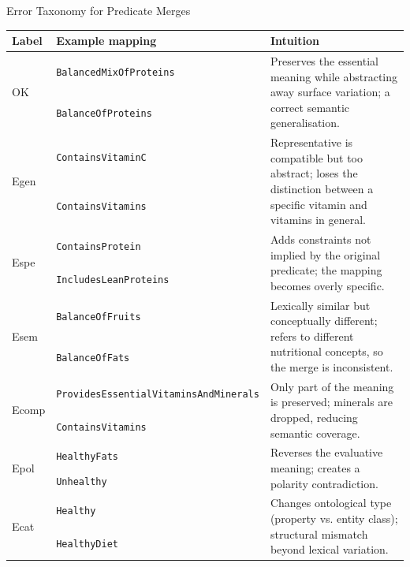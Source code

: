 \documentclass[presentation]{beamer}
\begin{document}
{\begin{frame}[allowframebreaks]{Error Taxonomy for Predicate Merges}
    \allowbreak

\tiny
\begin{table}[t]
\centering
\begin{tabular}{p{} p{} p{}}
\textbf{Label} & \textbf{Example mapping} & \textbf{Intuition}\\[0.2em]
\hline
\multirow{2}{*}{OK}
& \texttt{BalancedMixOfProteins} &
\multirow{2}{0.47\textwidth}{Preserves the essential meaning while abstracting away surface variation; a correct semantic generalisation.}
\\
& \texttt{BalanceOfProteins} &
\\[0.4em]

\multirow{2}{*}{Egen}
& \texttt{ContainsVitaminC} &
\multirow{2}{0.47\textwidth}{Representative is compatible but too abstract; loses the distinction between a specific vitamin and vitamins in general.}
\\
& \texttt{ContainsVitamins} &
\\[0.4em]

\multirow{2}{*}{Espe}
& \texttt{ContainsProtein} &
\multirow{2}{0.47\textwidth}{Adds constraints not implied by the original predicate; the mapping becomes overly specific.}
\\
& \texttt{IncludesLeanProteins} &
\\[0.4em]

\multirow{2}{*}{Esem}
& \texttt{BalanceOfFruits} &
\multirow{2}{0.47\textwidth}{Lexically similar but conceptually different; refers to different nutritional concepts, so the merge is inconsistent.}
\\
& \texttt{BalanceOfFats} &
\\[0.4em]

\multirow{2}{*}{Ecomp}
& \texttt{ProvidesEssentialVitaminsAndMinerals} &
\multirow{2}{0.47\textwidth}{Only part of the meaning is preserved; minerals are dropped, reducing semantic coverage.}
\\
& \texttt{ContainsVitamins} &
\\[0.4em]

\multirow{2}{*}{Epol}
& \texttt{HealthyFats} &
\multirow{2}{0.47\textwidth}{Reverses the evaluative meaning; creates a polarity contradiction.}
\\
& \texttt{Unhealthy} &
\\[0.4em]

\multirow{2}{*}{Ecat}
& \texttt{Healthy} &
\multirow{2}{0.47\textwidth}{Changes ontological type (property vs. entity class); structural mismatch beyond lexical variation.}
\\
& \texttt{HealthyDiet} &
\\[0.4em]


\end{tabular}
\end{table}
\end{frame}}
\end{document}
